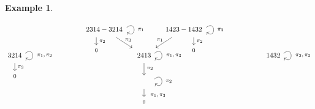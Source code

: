 \documentclass[12pt, reqno]{amsart}
\theoremstyle{definition}
\newtheorem{example}[theorem]{Example}
\numberwithin{equation}{section} \numberwithin{figure}{section}
\numberwithin{table}{section}
\begin{document}
\begin{example}
\[\begin{tikzpicture}
\node[] at (0*\hp, 1*\vp) {$2413$};
\node[] at (-3*\hp - 0.25*\hp, 1*\vp) {$3214$};
\node[] at (3*\hp + 0.25*\hp, 1*\vp) {$1432$};

\node[] at (-1*\hp, 2*\vp) {$2314 - 3214$};
\node[] at (1*\hp, 2*\vp) {$1423 - 1432$};

\draw[->] (-1.2*\hp, 1.7*\vp) -- (-1.2*\hp, 1.4*\vp);
\node at (-1.2*\hp, 1.2*\vp) {\footnotesize $0$};
\node at (-1.05*\hp, 1.55*\vp) {\footnotesize $\pi_2$};

\draw[->] (1.25*\hp, 1.7*\vp) -- (1.25*\hp, 1.4*\vp);
\node at (1.25*\hp, 1.2*\vp) {\footnotesize $0$};
\node at (1.4*\hp, 1.55*\vp) {\footnotesize $\pi_2$};

\node at (0*\hp + 0.2*\hp, 0*\vp) {} edge [out=40,in=320, loop] ();
\node at (0*\hp + 0.625*\hp, 0*\vp) {\footnotesize $\pi_2$};

\node at (-3*\hp + 0.2*\hp - 0.25*\hp, 1*\vp) {} edge [out=40,in=320, loop] ();
\node at (-3*\hp + 0.75*\hp - 0.25*\hp, 1*\vp) {\footnotesize $\pi_1, \pi_2$};

\node at (0*\hp + 0.2*\hp, 1*\vp) {} edge [out=40,in=320, loop] ();
\node at (0*\hp + 0.75*\hp, 1*\vp) {\footnotesize $\pi_1, \pi_3$};

\node at (3*\hp + 0.2*\hp + 0.25*\hp, 1*\vp) {} edge [out=40,in=320, loop] ();
\node at (3*\hp + 0.75*\hp + 0.25*\hp, 1*\vp) {\footnotesize $\pi_2, \pi_3$};

\node at (-1*\hp + 0.5*\hp, 2*\vp) {} edge [out=40,in=320, loop] ();
\node at (-1*\hp + 0.925*\hp, 2*\vp) {\footnotesize $\pi_1$};

\node at (1*\hp + 0.5*\hp, 2*\vp) {} edge [out=40,in=320, loop] ();
\node at (1*\hp + 0.925*\hp, 2*\vp) {\footnotesize $\pi_3$};

\draw[->] (0*\hp, 0.7*\vp) -- (0, 0.3);
\node at (0.15*\hp, 0.5*\vp) {\footnotesize $\pi_2$};


\draw[->] (-0.7*\hp, 1.7*\vp) -- (-0.3*\hp, 1.3*\vp);
\node at (-0.4*\hp, 1.6*\vp) {\footnotesize $\pi_3$};



\draw[->] (0.7*\hp, 1.7*\vp) -- (0.3*\hp, 1.3*\vp);
\node at (0.4*\hp, 1.6*\vp) {\footnotesize $\pi_1$};

\draw[->] (0 *\hp, -0.3*\vp) -- (0*\hp, -0.6*\vp);
\node at (0*\hp, -0.8*\vp) {\footnotesize $0$};
\node at (0.35*\hp, -.55*\vp) {\footnotesize $\pi_1, \pi_3$};


\draw[->] (-3*\hp - 0.25*\hp, 0.7*\vp) -- (-3*\hp - 0.25*\hp, 0.4*\vp);
\node at (-3*\hp - 0.25*\hp, 0.2*\vp) {\footnotesize $0$};
\node at (-2.85*\hp - 0.25*\hp, 0.55*\vp) {\footnotesize $\pi_3$};


\end{tikzpicture}\]
\end{example}
\end{document}
